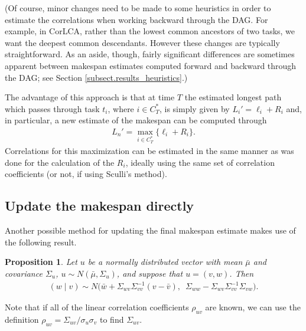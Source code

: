 \documentclass[12pt]{article}
\newtheorem{prop}[theorem]{Proposition}
\begin{document}
(Of course, minor changes need to be made to some heuristics in order to estimate the correlations when working backward through the DAG. For example, in CorLCA, rather than the lowest common ancestors of two tasks, we want the deepest common descendants. However these changes are typically straightforward. As an aside, though, fairly significant differences are sometimes apparent between makespan estimates computed forward and backward through the DAG; see Section \ref{subsect.results_heuristics}.) 

The advantage of this approach is that at time $T$ the estimated longest path which passes through task $t_i$, where $i \in C_T^*$, is simply given by $L_i' = \ell_i + R_i$ and, in particular, a new estimate of the makespan can be computed through
\begin{align*}
  L_n' = \max_{i \in C_T^*} \{ \ell_i + R_i  \}.
\end{align*}
Correlations for this maximization can be estimated in the same manner as was done for the calculation of the $R_i$, ideally using the same set of correlation coefficients (or not, if using Sculli's method).

\subsection{Update the makespan directly}
\label{subsect.corr_update}

Another possible method for updating the final makespan estimate makes use of the following result.
\begin{prop}
	Let $u$ be a normally distributed vector with mean $\bar{\mu}$ and covariance $\Sigma_u$, $u \sim N(\bar{\mu}, \Sigma_u)$, and suppose that $u = (v, w)$. Then 
	\begin{align*}
	(w \mid v) \sim N \big( \bar{w} + \Sigma_{wv}\Sigma_{vv}^{-1} (v - \bar{v}), \enspace  \Sigma_{ww} - \Sigma_{wv} \Sigma_{vv}^{-1} \Sigma_{vw} \big).
	\end{align*}
\end{prop}
Note that if all of the linear correlation coefficients $\rho_{uv}$ are known, we can use the definition $\rho_{uv} = \Sigma_{uv} / \sigma_u \sigma_v$ to find $\Sigma_{uv}$.
\end{document}
